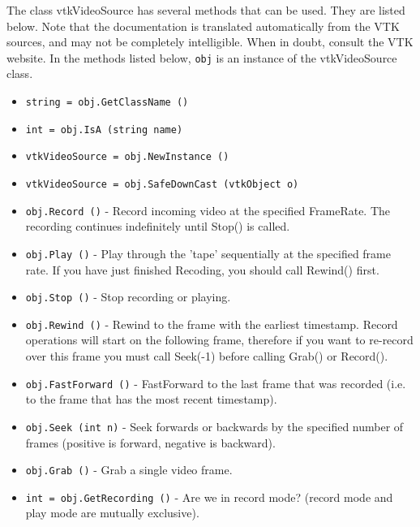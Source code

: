 The class vtkVideoSource has several methods that can be used.
  They are listed below.
Note that the documentation is translated automatically from the VTK sources,
and may not be completely intelligible.  When in doubt, consult the VTK website.
In the methods listed below, \verb|obj| is an instance of the vtkVideoSource class.
\begin{itemize}
\item  \verb|string = obj.GetClassName ()|

\item  \verb|int = obj.IsA (string name)|

\item  \verb|vtkVideoSource = obj.NewInstance ()|

\item  \verb|vtkVideoSource = obj.SafeDownCast (vtkObject o)|

\item  \verb|obj.Record ()| -  Record incoming video at the specified FrameRate.  The recording
 continues indefinitely until Stop() is called. 

\item  \verb|obj.Play ()| -  Play through the 'tape' sequentially at the specified frame rate.
 If you have just finished Recoding, you should call Rewind() first.

\item  \verb|obj.Stop ()| -  Stop recording or playing.

\item  \verb|obj.Rewind ()| -  Rewind to the frame with the earliest timestamp.  Record operations
 will start on the following frame, therefore if you want to re-record
 over this frame you must call Seek(-1) before calling Grab() or Record().

\item  \verb|obj.FastForward ()| -  FastForward to the last frame that was recorded (i.e. to the frame
 that has the most recent timestamp).

\item  \verb|obj.Seek (int n)| -  Seek forwards or backwards by the specified number of frames
 (positive is forward, negative is backward).

\item  \verb|obj.Grab ()| -  Grab a single video frame.

\item  \verb|int = obj.GetRecording ()| -  Are we in record mode? (record mode and play mode are mutually
 exclusive).


\end{itemize}
